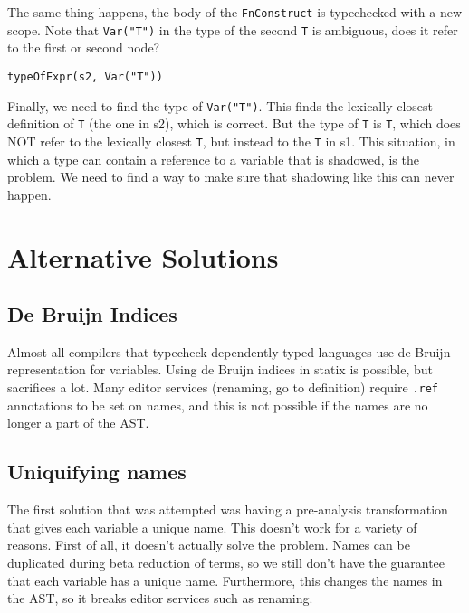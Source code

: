 \noindent
The same thing happens, the body of the \verb|FnConstruct| is typechecked with a new scope. Note that \verb|Var("T")| in the type of the second \verb|T| is ambiguous, does it refer to the first or second node?

\begin{lstlisting}
typeOfExpr(s2, Var("T"))
\end{lstlisting}

Finally, we need to find the type of \verb|Var("T")|. This finds the lexically closest definition of \verb|T| (the one in s2), which is correct. But the type of \verb|T| is \verb|T|, which does NOT refer to the lexically closest \verb|T|, but instead to the \verb|T| in s1. This situation, in which a type can contain a reference to a variable that is shadowed, is the problem. We need to find a way to make sure that shadowing like this can never happen.

\section{Alternative Solutions}

\subsection{De Bruijn Indices}

Almost all compilers that typecheck dependently typed languages use de Bruijn representation for variables. Using de Bruijn indices in statix is possible, but sacrifices a lot. Many editor services (renaming, go to definition) require \verb|.ref| annotations to be set on names, and this is not possible if the names are no longer a part of the AST.

\subsection{Uniquifying names}

The first solution that was attempted was having a pre-analysis transformation that gives each variable a unique name. This doesn't work for a variety of reasons. First of all, it doesn't actually solve the problem. Names can be duplicated during beta reduction of terms, so we still don't have the guarantee that each variable has a unique name. Furthermore, this changes the names in the AST, so it breaks editor services such as renaming.

